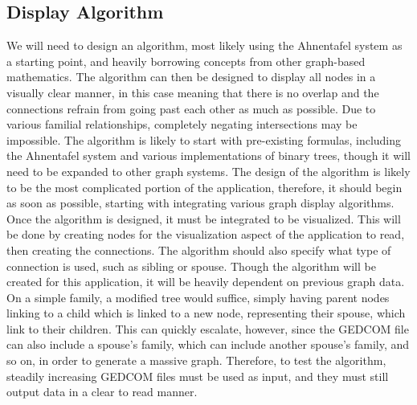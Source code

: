 \documentclass[onecolumn, draftclsnofoot, 10pt, compsoc]{IEEEtran}
\begin{document}
\subsection{Display Algorithm}
\begin{singlespace}
We will need to design an algorithm, most likely using the Ahnentafel system as a starting point, and heavily borrowing concepts from other graph-based mathematics. The algorithm can then be designed to display all nodes in a visually clear manner, in this case meaning that there is no overlap and the connections refrain from going past each other as much as possible. Due to various familial relationships, completely negating intersections may be impossible.
\newline
\newline
The algorithm is likely to start with pre-existing formulas, including the Ahnentafel system and various implementations of binary trees, though it will need to be expanded to other graph systems. The design of the algorithm is likely to be the most complicated portion of the application, therefore, it should begin as soon as possible, starting with integrating various graph display algorithms.
\newline
\newline
Once the algorithm is designed, it must be integrated to be visualized. This will be done by creating nodes for the visualization aspect of the application to read, then creating the connections. The algorithm should also specify what type of connection is used, such as sibling or spouse.
\newline
\newline
Though the algorithm will be created for this application, it will be heavily dependent on previous graph data. On a simple family, a modified tree would suffice, simply having parent nodes linking to a child which is linked to a new node, representing their spouse, which link to their children. This can quickly escalate, however, since the GEDCOM file can also include a spouse’s family, which can include another spouse’s family, and so on, in order to generate a massive graph. Therefore, to test the algorithm, steadily increasing GEDCOM files must be used as input, and they must still output data in a clear to read manner.

\end{singlespace}
\end{document}
